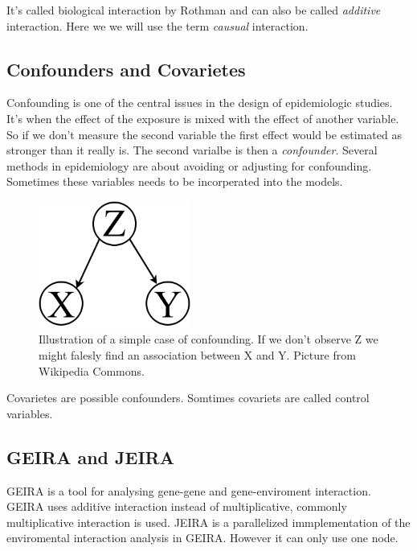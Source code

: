 \documentclass[10pt,a4paper]{article}
\begin{document}
It's called biological interaction by Rothman\cite{} and can also be called \emph{additive} interaction\cite{geira}. Here we we will use the term \emph{causual} interaction.\\


\subsection{Confounders and Covarietes}
Confounding is one of the central issues in the design of epidemiologic studies. It's when the effect of the exposure is mixed with the effect of another variable. So if we don't measure the second variable the first effect would be estimated as stronger than it really is. The second varialbe is then a \emph{confounder}. Several methods in epidemiology are about avoiding or adjusting for confounding. Sometimes these variables needs to be incorperated into the models.\cite{rothman2002intro_epidemiology}

\begin{figure}[h]
    \centering
    \includegraphics[width=5cm]{Simple_Confounding_Case.png}
    \caption{Illustration of a simple case of confounding. If we don't observe Z we might falesly find an association between X and Y. Picture from Wikipedia Commons.}
    \label{fig:awesome_image}
\end{figure}

 \cite{rothman1998modern}

Covarietes are possible confounders. Somtimes covariets are called control variables.

\subsection{GEIRA and JEIRA}
GEIRA is a tool for analysing gene-gene and gene-enviroment interaction. GEIRA uses additive interaction instead of multiplicative, commonly multiplicative interaction is used\cite{geira}. JEIRA is a parallelized immplementation of the enviromental interaction analysis in GEIRA. However it can only use one node.
\end{document}
